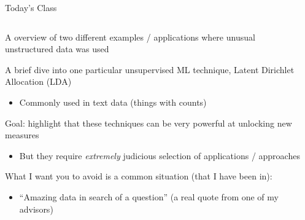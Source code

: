 \documentclass[notes,11pt, aspectratio=169]{beamer}
\newenvironment{wideitemize}{\itemize\addtolength{\itemsep}{10pt}}{\enditemize}
\begin{document}
\begin{frame}{Today's Class}
      \begin{columns}[onlytextwidth, T] %
      \begin{column}{.9\textwidth}
        \begin{wideitemize}
        \item A  overview of two different examples /
          applications where unusual unstructured data was used
        \item A brief dive into one particular unsupervised ML technique, Latent Dirichlet Allocation (LDA)
          \begin{itemize}
          \item Commonly used in text data (things with counts)
          \end{itemize}
        \item Goal: highlight that these techniques can be very powerful at unlocking new measures
          \begin{itemize}
          \item But they require \emph{extremely} judicious selection of applications / approaches 
          \end{itemize}
        \item What I want you to avoid is a common situation (that I have been in):
          \begin{itemize}
          \item ``Amazing data in search of a question'' (a real quote
            from one of my advisors)
          \end{itemize}
        \end{wideitemize}
      \end{column}%
      \hfill%
      \begin{column}{.5\textwidth}
      \end{column}%
    \end{columns}
\end{frame}
\end{document}
